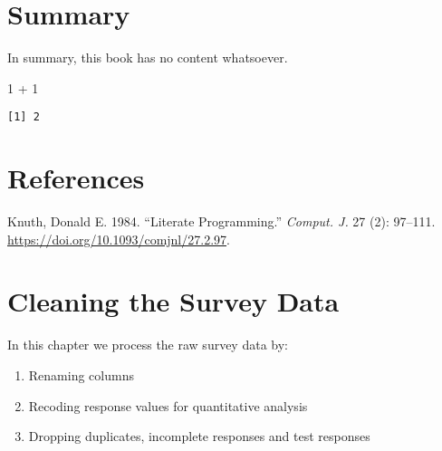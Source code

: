 \documentclass[
  letterpaper,
  DIV=11,
  numbers=noendperiod]{scrreprt}
\newenvironment{Shaded}{\begin{snugshade}}{\end{snugshade}}
\newcommand{\DecValTok}[1]{\textcolor[rgb]{0.68,0.00,0.00}{#1}}
\newcommand{\SpecialCharTok}[1]{\textcolor[rgb]{0.37,0.37,0.37}{#1}}
\providecommand{\tightlist}{%
  \setlength{\itemsep}{0pt}\setlength{\parskip}{0pt}}\usepackage{longtable,booktabs,array}
\newlength{\cslhangindent}
\newlength{\cslentryspacingunit} %
\newenvironment{CSLReferences}[2] %
 {%
  \setlength{\parindent}{0pt}
  \ifodd #1
  \let\oldpar\par
  \def\par{\hangindent=\cslhangindent\oldpar}
  \fi
  \setlength{\parskip}{#2\cslentryspacingunit}
 }%
 {}
\begin{document}

\hypertarget{summary}{%
\chapter{Summary}\label{summary}}

In summary, this book has no content whatsoever.

\begin{Shaded}
\begin{Highlighting}[]
\DecValTok{1} \SpecialCharTok{+} \DecValTok{1}
\end{Highlighting}
\end{Shaded}

\begin{verbatim}
[1] 2
\end{verbatim}


\hypertarget{references}{%
\chapter*{References}\label{references}}


\hypertarget{refs}{}
\begin{CSLReferences}{1}{0}
\leavevmode{}%
Knuth, Donald E. 1984. {``Literate Programming.''} \emph{Comput. J.} 27
(2): 97--111. \url{https://doi.org/10.1093/comjnl/27.2.97}.

\end{CSLReferences}


\hypertarget{cleaning-the-survey-data}{%
\chapter{Cleaning the Survey Data}\label{cleaning-the-survey-data}}

In this chapter we process the raw survey data by:

\begin{enumerate}
\def\labelenumi{\arabic{enumi}.}
\tightlist
\item
  Renaming columns
\item
  Recoding response values for quantitative analysis
\item
  Dropping duplicates, incomplete responses and test responses
\end{enumerate}
\end{document}
